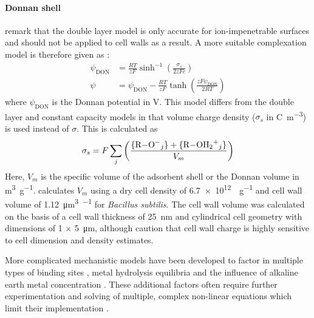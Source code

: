 \paragraph{Donnan shell} \textcite{Ohshima1990} remark that the double layer model is only accurate for ion-impenetrable surfaces and should not be applied to cell walls as a result. A more suitable complexation model is therefore given as \parencite{Ohshima1990, Turner2005}:
\begin{align}
\psi_\textrm{DON} &= \frac{RT}{zF} \sinh^{-1} \left( \frac{\sigma_s}{2zFc} \right)\\
\psi &= \psi_\textrm{DON} - \frac{RT}{zF} \tanh \left(\frac{zF \psi_\textrm{DON}}{2RT}\right)
\end{align}
where $ \psi_\textrm{DON} $ is the Donnan potential in \si{\volt}. This model differs from the double layer and constant capacity models in that volume charge density ($ \sigma_s $ in \si{\coulomb\per\meter\cubed}) is used instead of $ \sigma $. This is calculated as
\begin{equation}
\sigma_s = F\sum_j \left(\frac{\ce{\{R-O^-$_j$\} + \{R-OH2^+$_j$\}}}{V_m}\right)
\end{equation}
Here, $ V_m $ is the specific volume of the adsorbent shell or the Donnan volume in \si{\meter\cubed\per\gram}. \textcite{Yee2004} calculates $ V_m $ using a dry cell density of \SI{6.7e12}{\cell\per\gram} and cell wall volume of \SI{1.12}{\micro\meter\cubed\per\cell} for \textit{Bacillus subtilis}. The cell wall volume was calculated on the basis of a cell wall thickness of \SI{25}{\nano\meter} and cylindrical cell geometry with dimensions of 1 $ \times $ \SI{5}{\micro\meter}, although \textcite{Yee2004} caution that cell wall charge is highly sensitive to cell dimension and density estimates. 

More complicated mechanistic models have been developed to factor in multiple types of binding sites \parencite{Pagnanelli2005}, metal hydrolysis equilibria \parencite{Yang1999,Haas2001,Dai2010} and the influence of alkaline earth metal concentration \parencite{Chen2006}. These additional factors often require further experimentation and solving of multiple, complex non-linear equations which limit their implementation \parencite{Vijayaraghavan2008}.

